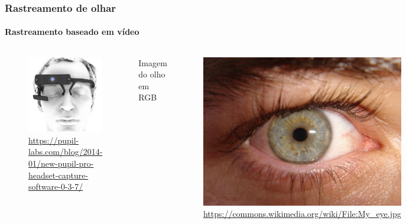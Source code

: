 \documentclass[11pt]{beamer}
\begin{document}
\begin{frame}
\frametitle{Rastreamento de olhar}
\framesubtitle{Rastreamento baseado em vídeo}
\begin{columns}[t]
\centering
\hspace{10cm}
\begin{figure}
\includegraphics[scale=.6]{imagens/pupil.png}
\caption{\tiny{\url{https://pupil-labs.com/blog/2014-01/new-pupil-pro-headset-capture-software-0-3-7/}}}
\end{figure}
\centering
Imagem do olho em RGB
\begin{figure}
\includegraphics[scale=.03]{imagens/Myeye.jpg}
\caption{\tiny{\url{https://commons.wikimedia.org/wiki/File:My_eye.jpg}}}
\end{figure}
\vspace{.2cm}
Imagem  em Infravermelho\\
\includegraphics[scale=.65]{imagens/26.jpg}
\end{columns}
\end{frame}
\end{document}
